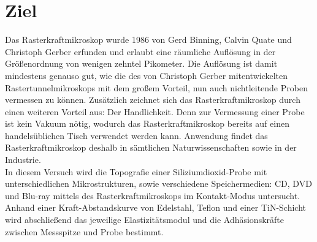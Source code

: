 \section{Ziel}
\label{sec:Ziel}

Das Rasterkraftmikroskop wurde 1986 von Gerd Binning, Calvin Quate und Christoph
Gerber \cite{entw} erfunden und erlaubt eine räumliche Auflösung in der Größenordnung von
wenigen zehntel Pikometer. Die Auflösung ist damit mindestens genauso gut, wie die
des von Christoph Gerber mitentwickelten Rastertunnelmikroskops mit dem großem
Vorteil, nun auch nichtleitende Proben vermessen zu können. Zusätzlich zeichnet
sich das Rasterkraftmikroskop durch einen weiteren Vorteil aus: Der Handlichkeit.
Denn zur Vermessung einer Probe ist kein Vakuum nötig, wodurch das Rasterkraftmikroskop
bereits auf einen handelsüblichen Tisch verwendet werden kann. Anwendung findet das
Rasterkraftmikroskop deshalb in sämtlichen Naturwissenschaften sowie in der
Industrie.\\
In diesem Versuch wird die Topografie einer Siliziumdioxid-Probe mit unterschiedlichen
Mikrostrukturen, sowie verschiedene Speichermedien: CD, DVD und Blu-ray mittels
des Rasterkraftmikroskops im Kontakt-Modus untersucht. Anhand einer
Kraft-Abstandskurve von Edelstahl, Teflon und einer TiN-Schicht wird abschließend
das jeweilige Elastizitätsmodul und die Adhäsionskräfte zwischen Messspitze und
Probe bestimmt.
